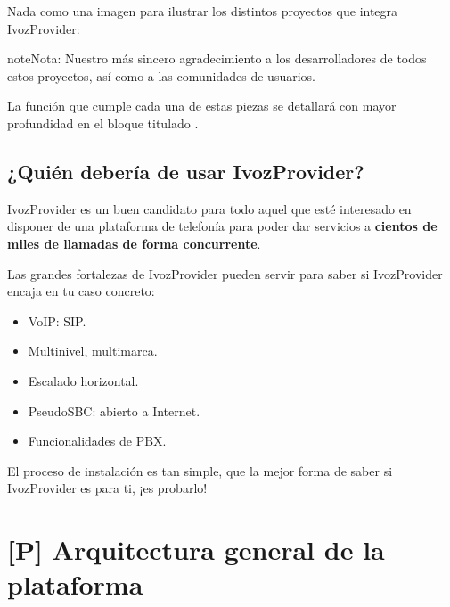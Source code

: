 \documentclass[letterpaper,10pt,spanish]{sphinxmanual}
\begin{document}
Nada como una imagen para ilustrar los distintos proyectos que integra IvozProvider:


\begin{notice}{note}{Nota:}
Nuestro más sincero agradecimiento a los desarrolladores de todos estos proyectos, así como a las comunidades de usuarios.
\end{notice}

La función que cumple cada una de estas piezas se detallará con mayor profundidad en el bloque titulado {\hyperref[architecture/index:architecture]{}}.


\section{¿Quién debería de usar IvozProvider?}
\label{intro/use_cases::doc}\label{intro/use_cases:quien-deberia-de-usar-ivozprovider}
IvozProvider es un buen candidato para todo aquel que esté interesado en disponer de una plataforma de telefonía para poder dar servicios a \textbf{cientos de miles de llamadas de forma concurrente}.

Las grandes fortalezas de IvozProvider pueden servir para saber si IvozProvider encaja en tu caso concreto:
\begin{itemize}
\item {} 
VoIP: SIP.

\item {} 
Multinivel, multimarca.

\item {} 
Escalado horizontal.

\item {} 
PseudoSBC: abierto a Internet.

\item {} 
Funcionalidades de PBX.

\end{itemize}

El proceso de instalación es tan simple, que la mejor forma de saber si IvozProvider es para ti, ¡es probarlo!


\chapter{{[}P{]} Arquitectura general de la plataforma}
\label{architecture/index:p-arquitectura-general-de-la-plataforma}\label{architecture/index::doc}\label{architecture/index:architecture}
\end{document}
